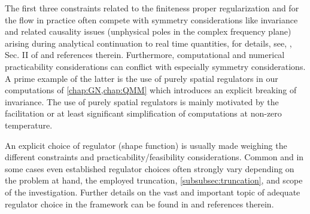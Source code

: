 The first three constraints related to the finiteness \dash{} proper regularization and \ic{} for the \frg{} flow \dash{} in practice often compete with symmetry considerations like \Poincare{} invariance and related causality issues (unphysical poles in the complex frequency plane) arising during analytical continuation to real time quantities, for details, see, \eg{}, Sec. II of  and references therein.
Furthermore, computational and numerical practicability considerations can conflict with especially symmetry considerations.
A prime example of the latter is the use of purely spatial regulators in our computations of \cref{chap:GN,chap:QMM} which introduces an explicit breaking of \Poincare{} invariance. 
The use of purely spatial regulators is mainly motivated by the facilitation or at least significant simplification of computations at non-zero temperature.

An explicit choice of regulator (shape function) is usually made weighing the different constraints and practicability/feasibility considerations.
Common and in some cases even established regulator choices often strongly vary depending on the problem at hand, the employed truncation, \cf{} \cref{subsubsec:truncation}, and scope of the investigation.
Further details on the vast and important topic of adequate regulator choice in the \frg{} framework can be found in  and references therein.


